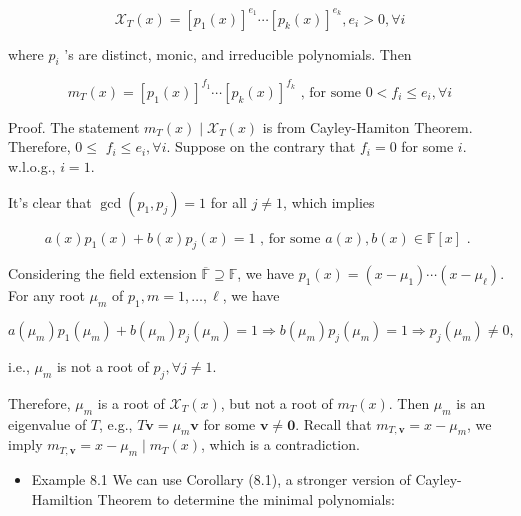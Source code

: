 \documentclass[11pt]{article}
\begin{document}
\[
{\mathcal{X}}_{T}\left( x\right)  = {\left\lbrack  {p}_1\left( x\right) \right\rbrack  }^{{e}_1}\cdots {\left\lbrack  {p}_{k}\left( x\right) \right\rbrack  }^{{e}_{k}},{e}_{i} > 0,\forall i
\]

where \({p}_{i}\) ’s are distinct, monic, and irreducible polynomials. Then

\[
{m}_{T}\left( x\right)  = {\left\lbrack  {p}_1\left( x\right) \right\rbrack  }^{{f}_1}\cdots {\left\lbrack  {p}_{k}\left( x\right) \right\rbrack  }^{{f}_{k}}\text{ , for some }0 < {f}_{i} \leq  {e}_{i},\forall i
\]

Proof. The statement \({m}_{T}\left( x\right)  \mid  {\mathcal{X}}_{T}\left( x\right)\) is from Cayley-Hamiton Theorem. Therefore, \(0 \leq\)  \({f}_{i} \leq  {e}_{i},\forall i\). Suppose on the contrary that \({f}_{i} = 0\) for some \(i\). w.l.o.g., \(i = 1\).

It’s clear that \(\gcd \left( {{p}_1,{p}_{j}}\right)  = 1\) for all \(j \neq  1\), which implies

\[
a\left( x\right) {p}_1\left( x\right)  + b\left( x\right) {p}_{j}\left( x\right)  = 1\text{ , for some }a\left( x\right) ,b\left( x\right)  \in  \mathbb{F}\left\lbrack  x\right\rbrack  \text{ . }
\]

Considering the field extension \(\overline{\mathbb{F}} \supseteq  \mathbb{F}\), we have \({p}_1\left( x\right)  = \left( {x - {\mu }_1}\right) \cdots \left( {x - {\mu }_{\ell }}\right)\). For any root \({\mu }_{m}\) of \({p}_1,m = 1,\ldots ,\ell\), we have

\[
a\left( {\mu }_{m}\right) {p}_1\left( {\mu }_{m}\right)  + b\left( {\mu }_{m}\right) {p}_{j}\left( {\mu }_{m}\right)  = 1 \Rightarrow  b\left( {\mu }_{m}\right) {p}_{j}\left( {\mu }_{m}\right)  = 1 \Rightarrow  {p}_{j}\left( {\mu }_{m}\right)  \neq  0,
\]

i.e., \({\mu }_{m}\) is not a root of \({p}_{j},\forall j \neq  1\).

Therefore, \({\mu }_{m}\) is a root of \({\mathcal{X}}_{T}\left( x\right)\), but not a root of \({m}_{T}\left( x\right)\). Then \({\mu }_{m}\) is an eigenvalue of \(T\), e.g., \(T\mathbf{v} = {\mu }_{m}\mathbf{v}\) for some \(\mathbf{v} \neq  \mathbf{0}\). Recall that \({m}_{T,\mathbf{v}} = x - {\mu }_{m}\), we imply \({m}_{T,\mathbf{v}} = x - {\mu }_{m} \mid  {m}_{T}\left( x\right)\), which is a contradiction.

\begin{itemize}
\item Example 8.1 We can use Corollary (8.1), a stronger version of Cayley-Hamiltion Theorem to determine the minimal polynomials:
\end{itemize}
\end{document}
